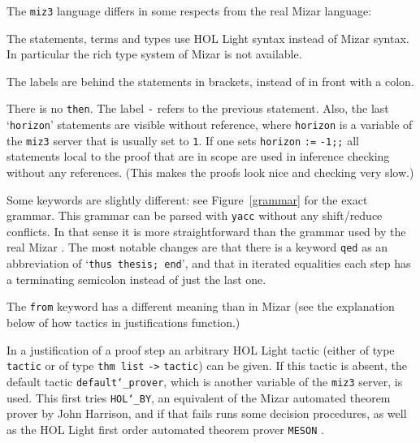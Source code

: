\documentclass{LMCS}
\begin{document}
The \texttt{miz3} language differs in some respects from the real Mizar language:
\begin{iteMize}{}
\item
The statements, terms and types use HOL Light syntax instead of Mizar 
syntax.
In particular the rich type system of Mizar \cite{wie:07:2} is not available.

\item
The labels are behind the statements in brackets, instead of
in front with a colon.

\item
There is no \texttt{then}.
The label \texttt{-} refers to the previous statement.
Also, the last `\texttt{horizon}' statements are visible without
reference, where \texttt{horizon} is a variable of the
\texttt{miz3} server that is usually set to \texttt{1}.
If one sets \texttt{horizon} \texttt{:=} \texttt{-1;;} all statements local
to the proof that are in scope are used in inference checking
without any references.
(This makes the proofs look nice and checking very slow.)

\item
Some keywords are slightly different:
see Figure~\ref{grammar} for the exact grammar.
This grammar can be parsed with \texttt{yacc} without
any shift/reduce conflicts.
In that sense it is more straightforward than the grammar used by the real Mizar \cite{cai:gow:04}.
The most notable changes are that
there is a keyword \texttt{qed} as an abbreviation of `\texttt{thus thesis; end}',
and that in iterated equalities {each} step has
a terminating semicolon instead of just the last one.

\item
The \texttt{from} keyword has a different meaning than in Mizar
(see the explanation below of how tactics in justifications function.)

\end{iteMize}

\noindent
In a justification of a proof step an arbitrary HOL Light tactic (either of
type \texttt{tactic} or of type \texttt{thm list} \texttt{->} \texttt{tactic}) can be given.
If this tactic is absent, the default tactic \texttt{default\char`\_{}prover}, which is another variable of the \texttt{miz3} server, is used.
This first tries \texttt{HOL\char`\_BY},
an equivalent of the Mizar automated theorem prover
by John Harrison, and if that fails runs some decision procedures, as well as the
HOL Light first order automated theorem prover \texttt{MESON} \cite{har:96:1}.
\end{document}
